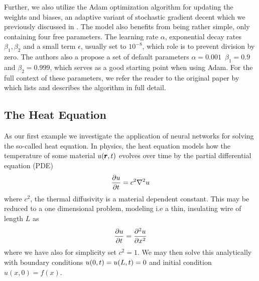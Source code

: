 \documentclass[reprint, english, nofootinbib]{revtex4-2}
\begin{document}
Further, we also utilize the Adam optimization algorithm \cite{kingma2017adam} for updating the weights and biases, an adaptive variant of stochastic gradient decent which we previously discussed in \cite{4155_project_2}. The model also benefits from being rather simple, only containing four free parameters. The learning rate $\alpha$, exponential decay rates $\beta_1, \beta_2$ and a small term $\epsilon$, usually set to $10^{-8}$, which role is to prevent division by zero. The authors also a propose a set of default parameters $\alpha=0.001\enspace \beta_1=0.9$ and $\beta_2 = 0.999$, which serves as a good starting point when using Adam. For the full context of these parameters, we refer the reader to the original paper by \textcite{kingma2017adam} which lists and describes the algorithm in full detail.

\subsection{The Heat Equation\label{sec:Heat equation analytical}}
\noindent
As our first example we investigate the application of neural networks for solving the so-called heat equation. In physics, the heat equation models how the temperature of some material $u\qty(\pmb r, t)$ evolves over time by the partial differential equation (PDE)
\begin{equation}
    \pdv{u}{t} = c^2\nabla^2 u 
\end{equation}
where $c^2$, the thermal diffusivity is a material dependent constant. 
This may be reduced to a one dimensional problem, modeling i.e a thin, insulating wire of length $L$ as
\begin{equation}\label{eqn: 1D heat eqn}
    \pdv{u}{t} = \pdv[2]{u}{x}
\end{equation}
where we have also for simplicity set $c^2 = 1$. We may then solve this analytically with boundary conditions $u\qty(0, t) = u\qty(L,t) = 0$ and initial condition $u(x, 0) = f(x)$.
\end{document}
